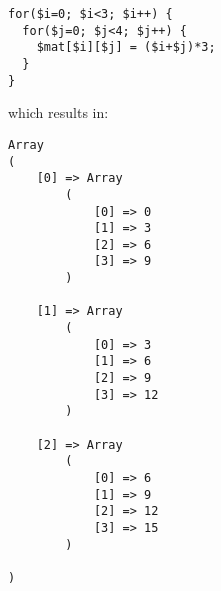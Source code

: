 \begin{verbatim}
for($i=0; $i<3; $i++) {
  for($j=0; $j<4; $j++) {
    $mat[$i][$j] = ($i+$j)*3;
  }
}
\end{verbatim}

which results in:

\begin{verbatim}
Array
(
    [0] => Array
        (
            [0] => 0
            [1] => 3
            [2] => 6
            [3] => 9
        )

    [1] => Array
        (
            [0] => 3
            [1] => 6
            [2] => 9
            [3] => 12
        )

    [2] => Array
        (
            [0] => 6
            [1] => 9
            [2] => 12
            [3] => 15
        )

)
\end{verbatim}

